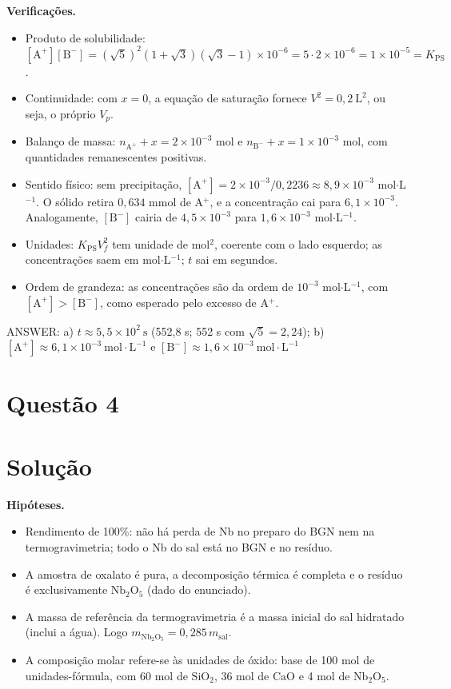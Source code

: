 \documentclass{article}%
\begin{document}
\textbf{Verificações.}
\begin{itemize}
\item Produto de solubilidade: $[\text{A}^+][\text{B}^-] = \left(\sqrt{5}\right)^{2}(1+\sqrt{3})(\sqrt{3}-1)\times10^{-6} = 5\cdot 2\times10^{-6} = 1\times10^{-5} = K_{\text{PS}}$.
\item Continuidade: com $x = 0$, a equação de saturação fornece $V^2 = 0{,}2\ \text{L}^2$, ou seja, o próprio $V_p$.
\item Balanço de massa: $n_{\text{A}^+} + x = 2\times10^{-3}$ mol e $n_{\text{B}^-} + x = 1\times10^{-3}$ mol, com quantidades remanescentes positivas.
\item Sentido físico: sem precipitação, $[\text{A}^+] = 2\times10^{-3}/0{,}2236 \approx 8{,}9\times10^{-3}$ mol$\cdot$L$^{-1}$. O sólido retira $0{,}634$ mmol de A$^+$, e a concentração cai para $6{,}1\times10^{-3}$. Analogamente, $[\text{B}^-]$ cairia de $4{,}5\times10^{-3}$ para $1{,}6\times10^{-3}$ mol$\cdot$L$^{-1}$.
\item Unidades: $K_{\text{PS}}V_f^2$ tem unidade de mol$^2$, coerente com o lado esquerdo; as concentrações saem em mol$\cdot$L$^{-1}$; $t$ sai em segundos.
\item Ordem de grandeza: as concentrações são da ordem de $10^{-3}$ mol$\cdot$L$^{-1}$, com $[\text{A}^+] > [\text{B}^-]$, como esperado pelo excesso de A$^+$.
\end{itemize}

ANSWER: a) $t \approx 5{,}5\times10^{2}\ \text{s}$ (552,8 s; 552 s com $\sqrt{5} = 2{,}24$); b) $[\text{A}^+] \approx 6{,}1\times10^{-3}\ \text{mol}\cdot\text{L}^{-1}$ e $[\text{B}^-] \approx 1{,}6\times10^{-3}\ \text{mol}\cdot\text{L}^{-1}$%
\newpage%
\section*{Questão 4}

\section*{Solução}

\textbf{Hipóteses.}
\begin{itemize}
\item[(i)] Rendimento de 100\%: não há perda de Nb no preparo do BGN nem na termogravimetria; todo o Nb do sal está no BGN e no resíduo.
\item[(ii)] A amostra de oxalato é pura, a decomposição térmica é completa e o resíduo é exclusivamente $\mathrm{Nb_2O_5}$ (dado do enunciado).
\item[(iii)] A massa de referência da termogravimetria é a massa inicial do sal hidratado (inclui a água). Logo $m_{\mathrm{Nb_2O_5}} = 0{,}285\,m_{\text{sal}}$.
\item[(iv)] A composição molar refere-se às unidades de óxido: base de 100 mol de unidades-fórmula, com 60 mol de $\mathrm{SiO_2}$, 36 mol de $\mathrm{CaO}$ e 4 mol de $\mathrm{Nb_2O_5}$.
\end{itemize}
\end{document}

